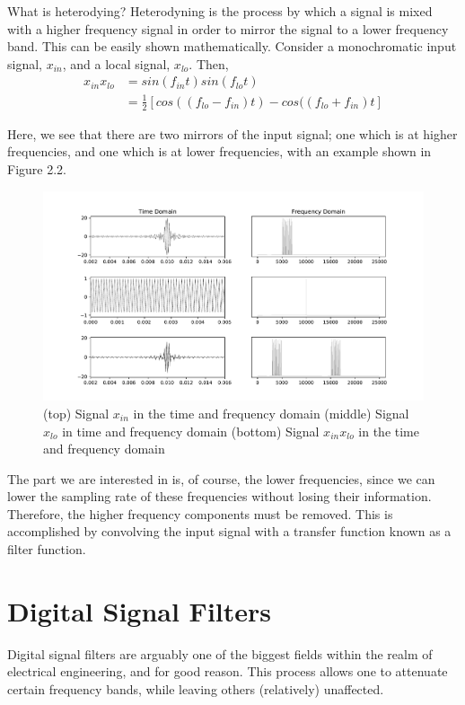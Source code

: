 \documentclass{report}
\begin{document}
What is heterodying? Heterodyning is the process by which a signal is mixed with a higher frequency signal in order to mirror the signal to a lower frequency band.  This can be easily shown mathematically.  Consider a monochromatic input signal, $x_{in}$, and a local signal, $x_{lo}$.  Then,
\begin{align}
x_{in}x_{lo}& = sin(f_{in}t)sin(f_{lo}t)\\
             & = \frac{1}{2}[cos((f_{lo}-f_{in})t) - cos((f_{lo}+f_{in})t]
\end{align}

Here, we see that there are two mirrors of the input signal; one which is at higher frequencies, and one which is at lower frequencies, with an example shown in Figure 2.2.  
\begin{figure}[ht]
\includegraphics[scale=.45]{Figure_1.pdf}
\caption{(top) Signal $x_{in}$ in the time and frequency domain (middle) Signal $x_{lo}$ in time and frequency domain (bottom) Signal $x_{in}x_{lo}$ in the time and frequency domain}
\end{figure}

The part we are interested in is, of course, the lower frequencies, since we can lower the sampling rate of these frequencies without losing their information.  Therefore, the higher frequency components must be removed.  This is accomplished by convolving the input signal with a transfer function known as a filter function.

\section{Digital Signal Filters}

Digital signal filters are arguably one of the biggest fields within the realm of electrical engineering, and for good reason.  This process allows one to attenuate certain frequency bands, while leaving others (relatively) unaffected. 
\end{document}
